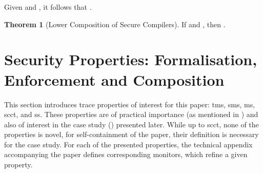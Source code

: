 \documentclass[dvipsnames,conference]{IEEEtran}
\theoremstyle{definition}
\newtheorem{theorem}{Theorem}[section]
\begin{document}

Given  and , it follows that .

\begin{theorem}[Lower Composition of Secure Compilers]\label{thm:lrtp}
  If  and , then . %
\end{theorem}


\section{Security Properties: Formalisation, Enforcement and Composition}\label{sec:compprop}

This section introduces trace properties of interest for this paper: \gls*{tms}, \gls*{sms}, \gls*{ms}, \gls*{scct}, and \gls*{ss}.
These properties are of practical importance (as mentioned in ) and also of interest in the case study () presented later. 
While up to \gls*{scct}, none of the properties is novel, for self-containment of the paper, their definition is necessary for the case study.
For each of the presented properties, the technical appendix accompanying the paper defines corresponding monitors, which refine a given property. 
\end{document}
